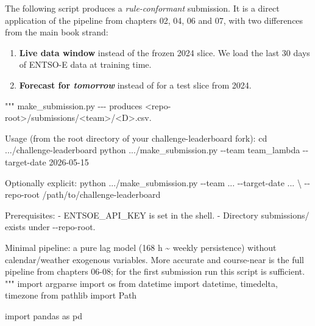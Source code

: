 \documentclass[
  english,
  letterpaper,
]{scrbook}
\newenvironment{Shaded}{\begin{snugshade}}{\end{snugshade}}
\newcommand{\CommentTok}[1]{\textcolor[rgb]{0.37,0.37,0.37}{#1}}
\newcommand{\ImportTok}[1]{\textcolor[rgb]{0.00,0.46,0.62}{#1}}
\newcommand{\NormalTok}[1]{\textcolor[rgb]{0.00,0.23,0.31}{#1}}
\newcommand{\OperatorTok}[1]{\textcolor[rgb]{0.37,0.37,0.37}{#1}}
\providecommand{\tightlist}{%
  \setlength{\itemsep}{0pt}\setlength{\parskip}{0pt}}
\begin{document}
The following script produces a \emph{rule-conformant} submission. It is
a direct application of the pipeline from chapters 02, 04, 06 and 07,
with two differences from the main book strand:

\begin{enumerate}
\def\labelenumi{\arabic{enumi}.}
\tightlist
\item
  \textbf{Live data window} instead of the frozen 2024 slice. We load
  the last 30 days of ENTSO-E data at training time.
\item
  \textbf{Forecast for \emph{tomorrow}} instead of for a test slice from
  2024.
\end{enumerate}

\protect{}\label{baseline-skript}
\begin{Shaded}
\begin{Highlighting}[]
\CommentTok{"""}
\CommentTok{make\_submission.py {-}{-}{-} produces \textless{}repo{-}root\textgreater{}/submissions/\textless{}team\textgreater{}/\textless{}D\textgreater{}.csv.}

\CommentTok{Usage (from the root directory of your challenge{-}leaderboard fork):}
\CommentTok{    cd .../challenge{-}leaderboard}
\CommentTok{    python .../make\_submission.py {-}{-}team team\_lambda {-}{-}target{-}date 2026{-}05{-}15}

\CommentTok{Optionally explicit:}
\CommentTok{    python .../make\_submission.py {-}{-}team ... {-}{-}target{-}date ... }\OperatorTok{\textbackslash{}}
\CommentTok{        {-}{-}repo{-}root /path/to/challenge{-}leaderboard}

\CommentTok{Prerequisites:}
\CommentTok{{-} ENTSOE\_API\_KEY is set in the shell.}
\CommentTok{{-} Directory \textasciigrave{}submissions/\textasciigrave{} exists under {-}{-}repo{-}root.}

\CommentTok{Minimal pipeline: a pure lag model (168 h \textasciitilde{} weekly persistence)}
\CommentTok{without calendar/weather exogenous variables. More accurate and}
\CommentTok{course{-}near is the full pipeline from chapters 06{-}08; for the first}
\CommentTok{submission run this script is sufficient.}
\CommentTok{"""}
\ImportTok{import}\NormalTok{ argparse}
\ImportTok{import}\NormalTok{ os}
\ImportTok{from}\NormalTok{ datetime }\ImportTok{import}\NormalTok{ datetime, timedelta, timezone}
\ImportTok{from}\NormalTok{ pathlib }\ImportTok{import}\NormalTok{ Path}

\ImportTok{import}\NormalTok{ pandas }\ImportTok{as}\NormalTok{ pd}


\end{Highlighting}
\end{Shaded}
\end{document}
